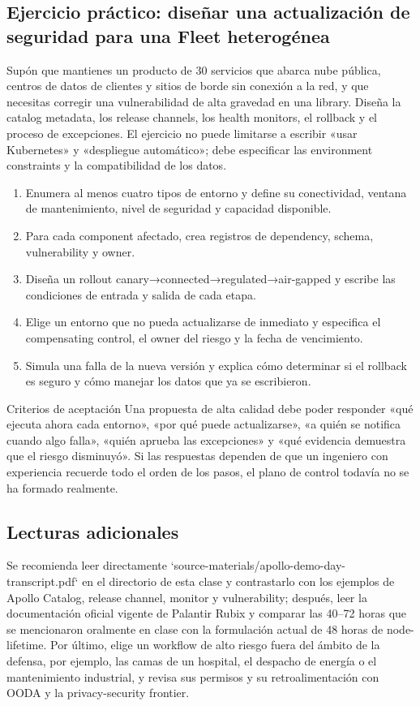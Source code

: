\documentclass[a4paper]{article}
\begin{document}
\subsection{Ejercicio práctico: diseñar una actualización de seguridad para una Fleet heterogénea}

Supón que mantienes un producto de 30 servicios que abarca nube pública, centros de datos de clientes y sitios de borde sin conexión a la red, y que necesitas corregir una vulnerabilidad de alta gravedad en una library. Diseña la catalog metadata, los release channels, los health monitors, el rollback y el proceso de excepciones. El ejercicio no puede limitarse a escribir «usar Kubernetes» y «despliegue automático»; debe especificar las environment constraints y la compatibilidad de los datos.

\begin{enumerate}
  \item Enumera al menos cuatro tipos de entorno y define su conectividad, ventana de mantenimiento, nivel de seguridad y capacidad disponible.
  \item Para cada component afectado, crea registros de dependency, schema, vulnerability y owner.
  \item Diseña un rollout canary→connected→regulated→air-gapped y escribe las condiciones de entrada y salida de cada etapa.
  \item Elige un entorno que no pueda actualizarse de inmediato y especifica el compensating control, el owner del riesgo y la fecha de vencimiento.
  \item Simula una falla de la nueva versión y explica cómo determinar si el rollback es seguro y cómo manejar los datos que ya se escribieron.
\end{enumerate}

\begin{knowledgebox}{Criterios de aceptación}
Una propuesta de alta calidad debe poder responder «qué ejecuta ahora cada entorno», «por qué puede actualizarse», «a quién se notifica cuando algo falla», «quién aprueba las excepciones» y «qué evidencia demuestra que el riesgo disminuyó». Si las respuestas dependen de que un ingeniero con experiencia recuerde todo el orden de los pasos, el plano de control todavía no se ha formado realmente.
\end{knowledgebox}

\subsection{Lecturas adicionales}

Se recomienda leer directamente `source-materials/apollo-demo-day-transcript.pdf` en el directorio de esta clase y contrastarlo con los ejemplos de Apollo Catalog, release channel, monitor y vulnerability; después, leer la documentación oficial vigente de Palantir Rubix y comparar las 40--72 horas que se mencionaron oralmente en clase con la formulación actual de 48 horas de node-lifetime. Por último, elige un workflow de alto riesgo fuera del ámbito de la defensa, por ejemplo, las camas de un hospital, el despacho de energía o el mantenimiento industrial, y revisa sus permisos y su retroalimentación con OODA y la privacy-security frontier.
\end{document}
